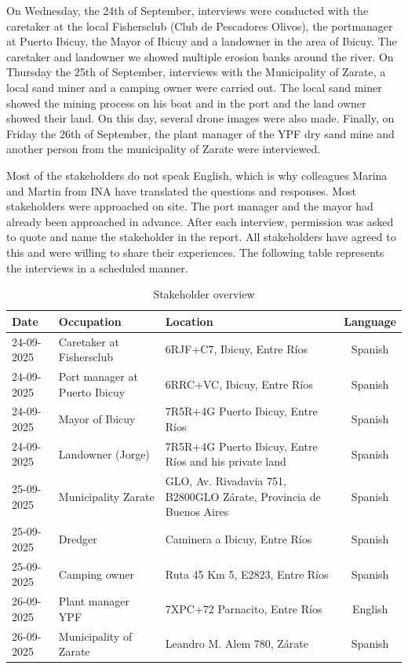 On Wednesday, the 24th of September, interviews were conducted with the caretaker at the local Fishersclub (Club de Pescadores Olivos), the portmanager at Puerto Ibicuy, the Mayor of Ibicuy and a landowner in the area of Ibicuy. The caretaker and landowner we showed multiple erosion banks around the river. On Thursday the 25th of September, interviews with the Municipality of Zarate, a local sand miner and a camping owner were carried out. The local sand miner showed the mining process on his boat and in the port and the land owner showed their land. On this day, several drone images were also made. Finally, on Friday the 26th of September, the plant manager of the YPF dry sand mine and another person from the municipality of Zarate were interviewed. 

Most of the stakeholders do not speak English, which is why colleagues Marina and Martin from INA have translated the questions and responses. Most stakeholders were approached on site. The port manager and the mayor had already been approached in advance. After each interview, permission was asked to quote and name the stakeholder in the report. All stakeholders have agreed to this and were willing to share their experiences. The following table represents the interviews in a scheduled manner. 

\begin{table}[H]
    \centering
    \renewcommand{\arraystretch}{1.2}
    \setlength{\tabcolsep}{4pt}
    \begin{tabularx}{\textwidth}{l l X c}
        \toprule
        \textbf{Date} & \textbf{Occupation} & \textbf{Location} & \textbf{Language} \\
        \midrule
        24-09-2025 & Caretaker at Fishersclub & 6RJF+C7, Ibicuy, Entre Ríos & Spanish \\
        24-09-2025 & Port manager at Puerto Ibicuy & 6RRC+VC, Ibicuy, Entre Ríos & Spanish \\
        24-09-2025 & Mayor of Ibicuy & 7R5R+4G Puerto Ibicuy, Entre Ríos & Spanish \\
        24-09-2025 & Landowner (Jorge) & 7R5R+4G Puerto Ibicuy, Entre Ríos and his private land & Spanish \\
        25-09-2025 & Municipality Zarate & GLO, Av. Rivadavia 751, B2800GLO Zárate, Provincia de Buenos Aires & Spanish \\
        25-09-2025 & Dredger & Caminera a Ibicuy, Entre Ríos & Spanish \\
        25-09-2025 & Camping owner & Ruta 45 Km 5, E2823, Entre Ríos & Spanish \\
        26-09-2025 & Plant manager YPF & 7XPC+72 Parnacito, Entre Ríos & English \\
        26-09-2025 & Municipality of Zarate & Leandro M. Alem 780, Zárate & Spanish \\
        \bottomrule
    \end{tabularx}
    \caption{Stakeholder overview}
    \label{tab:stakeholders}
\end{table}

